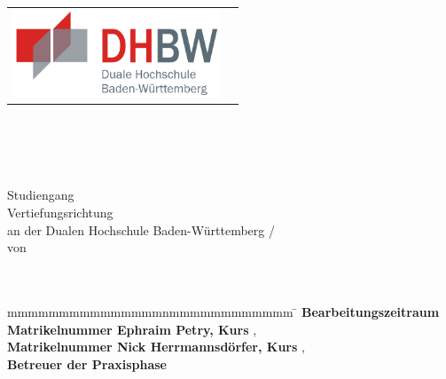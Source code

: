 \begin{titlepage}
\begin{longtable}{p{} p{}}
{\includegraphics[height=2.6cm]{images/dhbw-Logo.png}}
\end{longtable}
\enlargethispage{20mm}
\begin{center}
\vspace*{8mm} {\LARGE \bf \titel }\\
\vspace*{3mm} {\Large\bf \subtitel} \\
\vspace*{12mm} {\large \bf \arbeit}\\
\vspace*{12mm} {\large \bf \semester}\\
  
\vspace*{12mm} Studiengang  \textit{\studiengang\\}
\vspace*{5mm} Vertiefungsrichtung \textit{\vertiefung\\}
\vspace*{9mm} an der \linebreak Dualen Hochschule Baden-Württemberg / \dhbw\\
\vspace*{12mm} von\\ 
\vspace*{3mm} {\large\bf \autor}\\
\vspace*{12mm} \datumAbgabe\\
\end{center}
\vfill
\begin{spacing}{1.2}
\begin{tabbing}
mmmmmmmmmmmmmmmnmmmmmmmmmmmm \= \kill
\textbf{Bearbeitungszeitraum} \> \zeitraum\\
\textbf{Matrikelnummer Ephraim Petry, Kurs} \> \martrikelnrEphraim, \kurs\\
\textbf{Matrikelnummer Nick Herrmannsdörfer, Kurs}\> \martrikelnrNick, \kurs\\
\textbf{Betreuer der Praxisphase} \> \betreuer\\
\end{tabbing}
\end{spacing}
\end{titlepage}